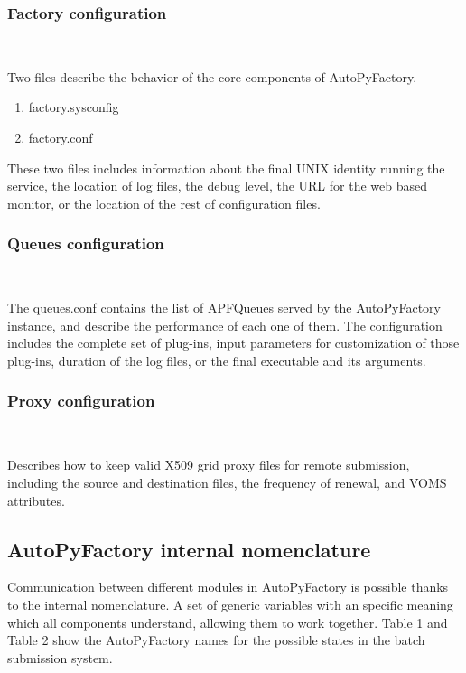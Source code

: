 \documentclass[a4paper]{jpconf}
\begin{document}
\subsubsection{Factory configuration}

~

\noindent Two files describe the behavior of the core components of AutoPyFactory.

\begin{enumerate}
\item factory.sysconfig
\item factory.conf
\end{enumerate}

These two files includes information about the final UNIX identity running the service,
the location of log files, the debug level, the URL for the web based monitor, 
or the location of the rest of configuration files.

\subsubsection{Queues configuration}

~

\noindent The queues.conf contains the list of APFQueues served by the AutoPyFactory instance,
and describe the performance of each one of them. 
The configuration includes the complete set of plug-ins, 
input parameters for customization of those plug-ins, 
duration of the log files, 
or the final executable and its arguments.

\subsubsection{Proxy configuration}

~

\noindent Describes how to keep valid X509 grid proxy files for remote submission,
including the source and destination files, 
the frequency of renewal, 
and VOMS attributes.

\subsection{AutoPyFactory internal nomenclature}

Communication between different modules in AutoPyFactory 
is possible thanks to the internal nomenclature.
A set of generic variables with an specific meaning which all components 
understand, allowing them to work together. 
Table 1 and Table 2 show the AutoPyFactory names for the
possible states in the batch submission system. 
\end{document}
